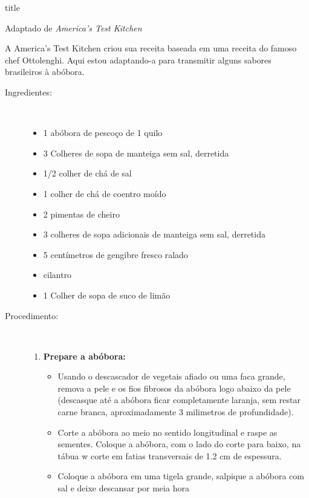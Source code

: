 \documentclass [11pt, letterpaper] {article}
\begin{document}
 {title}

\begin {flushright}
Adaptado de {\it America's Test Kitchen}
\end {flushright}

A America's Test Kitchen criou sua receita baseada em uma receita do famoso chef Ottolenghi. Aqui estou adaptando-a para transmitir alguns sabores brasileiros à abóbora.

\vspace {0.3in}

\begin {description}

\item [Ingredientes:] \ \\
\begin {itemize}
\item 1 abóbora de pesco\c{c}o de 1 quilo
\item 3 Colheres de sopa de manteiga sem sal, derretida
\item 1/2 colher de chá de sal
\item 1 colher de chá de coentro moído
\item 2 pimentas de cheiro
\item 3 colheres de sopa adicionais de manteiga sem sal, derretida
\item 5 cent\'imetros de gengibre fresco ralado
\item cilantro
\item 1 Colher de sopa de suco de limão
\end {itemize}

\item [Procedimento:] \ \\

\begin {enumerate}
\item {\bf Prepare a abóbora:}
\begin {itemize}
\item Usando o descascador de vegetais afiado ou uma faca grande, remova a pele e os fios fibrosos da abóbora logo abaixo da pele (descasque até a abóbora ficar completamente laranja, sem restar carne branca, aproximadamente 3 milimetros de profundidade).
\item Corte a abóbora ao meio no sentido longitudinal e raspe as sementes. Coloque a abóbora, com o lado do corte para baixo, na tábua w corte em fatias transversais de 1.2 cm de espessura.
\item Coloque a abóbora em uma tigela grande, salpique a abóbora com sal e deixe descansar por meia hora
\end {itemize}


\end{enumerate}
\end{description}
\end{document}
